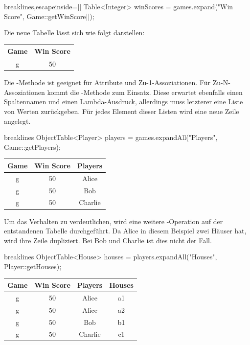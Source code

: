 \begin{jcodeblock*}{breaklines,escapeinside=||}
    Table<Integer> winScores = games.expand("Win Score", Game::getWinScore|\footnotemark|);
\end{jcodeblock*}

Die neue Tabelle lässt sich wie folgt darstellen:

\begin{tabular}{|c|c|}
    \hline
    \textbf{Game} & \textbf{Win Score} \\
    \hline
    g & 50 \\
    \hline
\end{tabular}

Die -Methode ist geeignet für Attribute und Zu-1-Assoziationen.
Für Zu-N-Assoziationen kommt die -Methode zum Einsatz.
Diese erwartet ebenfalls einen Spaltennamen und einen Lambda-Ausdruck, allerdings muss letzterer eine Liste von Werten zurückgeben.
Für jedes Element dieser Listen wird eine neue Zeile angelegt.

\begin{jcodeblock*}{breaklines}
    ObjectTable<Player> players = games.expandAll("Players", Game::getPlayers);
\end{jcodeblock*}

\begin{tabular}{|c|c|c|}
    \hline
    \textbf{Game} & \textbf{Win Score} & \textbf{Players} \\
    \hline
    g & 50 & Alice   \\
    g & 50 & Bob     \\
    g & 50 & Charlie \\
    \hline
\end{tabular}

Um das Verhalten zu verdeutlichen, wird eine weitere -Operation auf der entstandenen Tabelle durchgeführt.
Da Alice in diesem Beispiel zwei Häuser hat, wird ihre Zeile dupliziert.
Bei Bob und Charlie ist dies nicht der Fall.

\begin{jcodeblock*}{breaklines}
    ObjectTable<House> houses = players.expandAll("Houses", Player::getHouses);
\end{jcodeblock*}

\begin{tabular}{|c|c|c|c|}
    \hline
    \textbf{Game} & \textbf{Win Score} & \textbf{Players} & \textbf{Houses} \\
    \hline
    g & 50 & Alice   & a1 \\
    g & 50 & Alice   & a2 \\
    g & 50 & Bob     & b1 \\
    g & 50 & Charlie & c1 \\
    \hline
\end{tabular}


